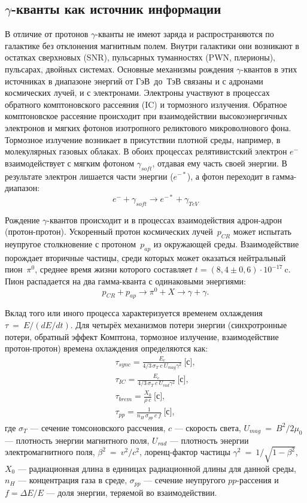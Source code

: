 \documentclass[magd,floatypics,numeref]{msudipl} %
\begin{document}
\subsection{$\gamma$-кванты как источник информации}
В отличие от протонов $\gamma$-кванты не имеют заряда и распространяются по галактике без отклонения магнитным полем. Внутри галактики они возникают в остатках сверхновых (SNR), пульсарных туманностях (PWN, плерионы), пульсарах, двойных системах. 
Основные механизмы рождения $\gamma$-квантов в этих источниках в диапазоне энергий от ГэВ~до~ТэВ связаны и с адронами космических лучей, и с электронами. Электроны участвуют в процессах обратного комптоновского рассеяния (IC) и тормозного излучения. Обратное комптоновское рассеяние происходит при взаимодействии высокоэнергичных электронов и мягких фотонов изотропного реликтового микроволнового фона. Тормозное излучение возникает в присутствии плотной среды, например, в молекулярных газовых облаках. В обоих процессах релятивистский электрон $e^-$ взаимодействует с мягким фотоном $\gamma_{soft}$, отдавая ему часть своей энергии. В результате электрон лишается части энергии ($e^{-*}$), а фотон переходит в гамма-диапазон:
\begin{equation}
e^- + \gamma_{soft} \rightarrow e^{-*} + \gamma_{TeV}
\end{equation}

Рождение $\gamma$-квантов происходит и в процессах взаимодействия адрон-адрон (протон-протон). Ускоренный протон космических лучей~$p_{CR}$ может испытать неупругое столкновение с протоном~$p_{ap}$ из окружающей среды. Взаимодействие порождает вторичные частицы, среди которых может оказаться нейтральный пион~$\pi^0$, среднее время жизни которого составляет $t=(8,4\pm0,6)\cdot10^{-17}~$c. Пион распадается на два гамма-кванта с одинаковыми энергиями:
\begin{equation}
p_{CR}+p_{ap}\rightarrow\pi^0+X\rightarrow \gamma+\gamma.
\end{equation}

Вклад того или иного процесса характеризуется временем охлаждения $\tau~=~E/(dE/dt)$. Для четырёх механизмов потери энергии (синхротронные потери, обратный эффект Комптона, тормозное излучение, взаимодействие протон-протон) времена охлаждения определяются как:
\begin{align}
\tau_{sync} = \frac{E_e}{4/3 \,\sigma_T~c~U_{mag} \gamma^2}~\text{[с]}, \\
\tau_{IC} = \frac{E_e}{4/3 \,\sigma_T ~c~U_{rad}   \gamma^2}~\text{[с]}, \\
\tau_{brem} = \frac{X_0}{\rho~c}~\text{[с]}, \\
\tau_{pp} = \frac{1}{n_H \,\sigma_{pp}~c~f}~\text{[с]},
\end{align}
где $\sigma_T$ --- сечение томсоновского рассчения, $c$ --- скорость света,  $U_{mag}~=~B^2/2\mu_0$ --- плотность энергии магнитного поля, $U_{rad}$ --- плотность энергии электромагнитного поля, $\beta^2~=~v^2/c^2$, лоренц-фактор частицы $\gamma^2~=~1/\sqrt{1-\beta^2}$, $X_0$ --- радиационная длина в единицах радиационной длины для данной среды, $n_H$ --- концентрация газа в среде, $\sigma_{pp}$ --- сечение неупругого $pp$-рассения и $f = \Delta E/E$ --- доля энергии, теряемой во взаимодействии. 
\end{document}
